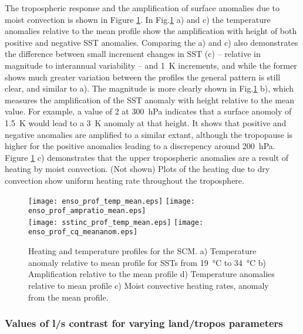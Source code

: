 The tropospheric response and the amplification of surface anomalies due to 
moist convection is shown in Figure \ref{fig:scmsstprof}.  In 
Fig.\ref{fig:scmsstprof} a) and c) the temperature anomalies relative to the 
mean profile show the amplification with height of both positive and negative 
SST anomalies. Comparing the a) and c) also demonstrates the difference between 
small increment changes in SST (c) -- relative in magnitude to interannual 
variability -- and \SI{1}{\kelvin} increments, and while the former shows much 
greater variation between the profiles the general pattern is still clear, and 
similar to a).  The magnitude is more clearly shown in Fig.\ref{fig:scmsstprof} 
b), which measures the amplification of the SST anomaly with height relative to 
the mean value.  For example, a value of 2 at \SI{300}{\hecto\pascal} indicates 
that a surface anomoly of \SI{1.5}{\kelvin} would lead to a \SI{3}{\kelvin} 
anomaly at that height.  It shows that positive and negative anomalies are 
amplified to a similar extant, although the tropopause is higher for the 
positive anomalies leading to a discrepency around \SI{200}{\hecto\pascal}.  
Figure \ref{fig:scmsstprof} c) demonstrates that the upper tropospheric 
anomalies are a result of heating by moist convection. (Not shown) Plots of the 
heating due to dry convection show uniform heating rate throughout the 
troposphere.

\begin{figure}[ht]
\texttt{[image: enso\_prof\_temp\_mean.eps]}
\texttt{[image: enso\_prof\_ampratio\_mean.eps]}\\
\texttt{[image: sstinc\_prof\_temp\_mean.eps]}
\texttt{[image: enso\_prof\_cq\_meananom.eps]}
\caption{Heating and temperature profiles for the SCM. a) Temperature anomaly 
	relative to mean profile for SSTs from \SI{19}{\degreeCelsius} to 
	\SI{34}{\degreeCelsius} b) Amplification relative to the mean profile d) 
	Temperature anomalies relative to mean profile c) Moist convective heating 
rates, anomaly from the mean profile.}
\label{fig:scmsstprof}
\end{figure}

\subsubsection{Values of l/s contrast for varying land/tropos parameters}

